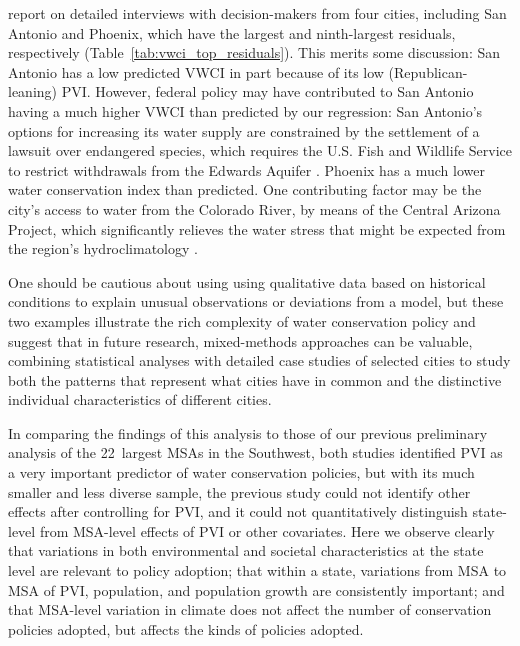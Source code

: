 \documentclass[draft,linenumbers]{agujournal}\usepackage{knitr}
\begin{document}
\citet{brown_politics_2016} report on detailed interviews with decision-makers from four cities, including
San Antonio and Phoenix, which have the largest and ninth-largest residuals, respectively
(Table~\ref{tab:vwci_top_residuals}). This merits some discussion: San Antonio has a low predicted VWCI in part because of its low (Republican-leaning) PVI. However, federal policy may have contributed to San Antonio having a much higher VWCI than predicted by our regression: San Antonio's options for increasing its water supply are constrained by the settlement of a lawsuit over endangered species, which requires the U.S. Fish and Wildlife Service to restrict withdrawals from the Edwards Aquifer \citep{brown_politics_2016}. Phoenix has a much lower water conservation index than predicted. One contributing factor may be the city's access to water from the Colorado River, by means of the Central Arizona Project, which significantly relieves the water stress that might be expected from the region's hydroclimatology \citep{brown_politics_2016}.

One should be cautious about using using qualitative data based on historical conditions to explain unusual observations or deviations from a model, but these two examples illustrate the rich complexity of water conservation policy and suggest that in future research, mixed-methods approaches can be valuable, combining statistical analyses with detailed case studies of selected cities to study both the patterns that represent what cities have in common and the distinctive individual characteristics of different cities.

In comparing the findings of this analysis to those of our previous preliminary analysis of the 22~largest MSAs in the Southwest, both studies identified PVI as a very important predictor of water conservation policies, but with its much smaller and less diverse sample, the previous study could not identify other effects after controlling for PVI, and it could not quantitatively distinguish state-level from MSA-level effects of PVI or other covariates. Here we observe clearly that variations in both environmental and societal characteristics at the state level are relevant to policy adoption; that within a state, variations from MSA to MSA of PVI, population, and population growth are consistently important; and that MSA-level variation in climate does not affect the number of conservation policies adopted, but affects the kinds of policies adopted.
\end{document}
